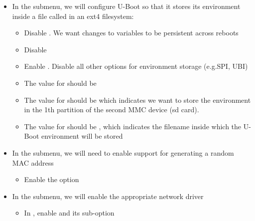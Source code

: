 \begin{itemize}

  \item In the  submenu, we will configure U-Boot so
    that it stores its environment inside a file called 
    in an ext4 filesystem:
    \begin{itemize}
    \item Disable . We want changes to variables to
      be persistent across reboots
    \item Disable 
    \item Enable . Disable all other
        options for environment storage (e.g.SPI, UBI)
    \item The value for  should be 
    \item The value for  should be  which indicates
      we want to store the environment in the 1th partition of the
      second MMC device (sd card).
    \item The value for  should be , which indicates the
      filename inside which the U-Boot environment will be stored
    \end{itemize}

  \item In the  submenu, we will need to enable
    support for generating a random MAC address
    \begin{itemize}
    \item Enable the option 
    \end{itemize}

  \item In the  submenu, we will enable the
    appropriate network driver

    \begin{itemize}
    \item In , enable  and its sub-option 
    \end{itemize}

  \end{itemize}

